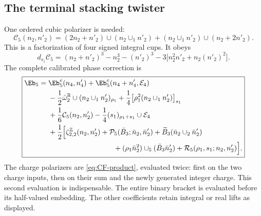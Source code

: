 \subsection{The terminal stacking twister}\label{subsec:E5full}
One ordered cubic polarizer is needed:
\begin{equation}\label{eq:cubic-polarizer}
 \mathcal C_5(n_2,n'_2)
 =(2n_2+n'_2)\cup(n_2\cup_1n'_2)
 +(n_2\cup_1n'_2)\cup(n_2+2n'_2).
\end{equation}
This is a factorization of four signed integral cups. It obeys
\begin{equation}\label{eq:dC5}
 d_{s_1}\mathcal C_5
 =(n_2+n'_2)^3-n_2^3-(n'_2)^3
 -3\big[n_2^2n'_2+n_2(n'_2)^2\big].
\end{equation}
The complete calibrated phase correction is
\begin{equation}\label{eq:4d-E5}
 \boxed{\begin{aligned}
 \Eb_5={}&\Eb^c_5(n_4,n'_4)
          +\Eb^c_5(n_4+n'_4,\mathcal E_4)\\
 &-\frac12\check\omega_2^{\mathbb R}\cup(n_2\cup_1n'_2)_{\rho_1}
   +\frac14\big[\rho_1^2(n_2\cup_1n'_2)\big]_{s_1}\\
 &+\frac16\mathcal C_5(n_2,n'_2)
   -\frac14(s_1)_{\rho_1+s_1}\cup\mathcal E_4\\
 &+\frac12\Big[
     \zeta^{\mathbb Z}_{2,2}(n_2,n'_2)
    +\mathcal P_5(\bar B_3;\bar n_2,\bar n'_2)
    +\widetilde B_3(\bar n_2\cup_2\bar n'_2)\\
 &\hspace{32mm}
    +(\rho_1\bar n_2^2)\cup_5(\bar B_3\bar n'_2)
    +\mathcal R_5(\rho_1,s_1;n_2,n'_2)\Big].
 \end{aligned}}
\end{equation}
The charge polarizers are \eqref{eq:CF-product}, evaluated twice: first on the two charge inputs, then on their sum and the newly generated integer charge. This second evaluation is indispensable. The entire binary bracket is evaluated before its half-valued embedding. The other coefficients retain integral or real lifts as displayed.

